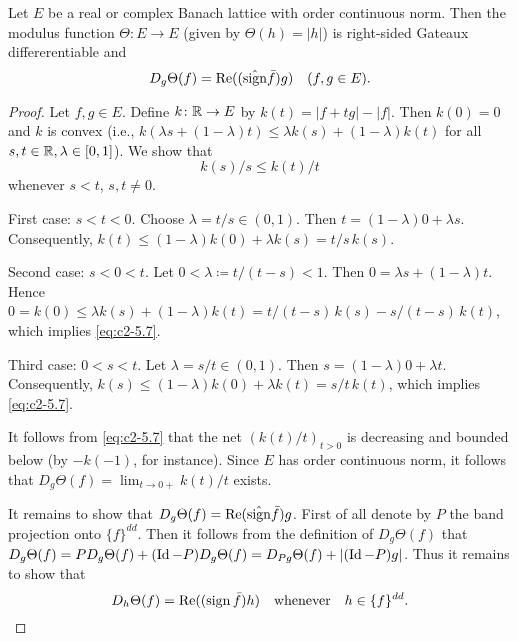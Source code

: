 \begin{proposition}\label{prop:c2-5.6}
Let $E$ be a real or complex Banach lattice with order continuous norm. 
Then the modulus function $\Theta \colon E \to E$ (given by $\Theta(h) = |h|$) is right-sided Gateaux differerentiable and
\begin{equation}\label{eq:c2-5.6}
D_{g}\Theta(f) = \mathop{}\!\mathrm{Re}((\hat{\operatorname{sign}}  \bar{f})g) \quad (f, g \in E).
\end{equation}
\end{proposition}

\begin{proof}
Let $f, g \in E$. Define $k \colon \mathbb{R} \to E$ by $k(t) = |f+tg| - |f|$.
Then $k(0) = 0$ and $k$ is convex (i.e., $k(\lambda s + (1-\lambda)t) \leq \lambda k(s) + (1-\lambda)k(t)$ for all $s, t \in \mathbb{R}, \lambda \in [0,1]$).
We show that
\begin{equation}\label{eq:c2-5.7}
k(s)/s \leq k(t)/t
\end{equation}
whenever $s < t$, $s,t \neq 0$.

First case: $s < t < 0$.
Choose $\lambda = t/s \in (0,1)$. 
Then $t = (1-\lambda)0 + \lambda s$. 
Consequently, $k(t) \leq (1-\lambda)k(0) + \lambda k(s) = t/s \, k(s)$.

Second case: $s < 0 < t$.
Let $0 < \lambda \coloneqq t/(t-s) < 1$. 
Then $0 = \lambda s + (1-\lambda)t$. 
Hence $0 = k(0) \leq \lambda k(s) + (1-\lambda)k(t) = t/(t-s) \, k(s) - s/(t-s) \, k(t)$, which implies \eqref{eq:c2-5.7}.

Third case: $0 < s < t$.
Let $\lambda = s/t \in (0,1)$. Then $s = (1-\lambda)0 + \lambda t$. Consequently, $k(s) \leq (1-\lambda)k(0) + \lambda k(t) = s/t \, k(t)$, which implies \eqref{eq:c2-5.7}.

It follows from \eqref{eq:c2-5.7} that the net $(k(t)/t)_{t>0}$ is decreasing and bounded below (by $-k(-1)$, for instance). Since $E$ has order continuous norm, it follows that $D_{g}\Theta(f) = \lim_{t \to 0+} k(t)/t$ exists.

It remains to show that $D_{g}\Theta(f) = \mathop{}\!\mathrm{Re}(\hat{\operatorname{sign}}  \bar{f})g$.
First of all denote by $P$ the band projection onto $\{f\}^{dd}$. Then it
follows from the definition of $D_{g}\Theta(f)$ that $D_{g}\Theta(f) = PD_{g}\Theta(f) + (\operatorname{Id}-P)D_{g}\Theta(f) = D_{Pg}\Theta(f) + |(\operatorname{Id}-P)g|$. 
Thus it remains to show that
\begin{equation}\label{eq:c2-5.8}
D_{h}\Theta(f) = \mathop{}\!\mathrm{Re}((\operatorname{sign}  \bar{f})h) \quad \text{whenever} \quad h \in \{f\}^{dd}.
\end{equation}


\end{proof}
